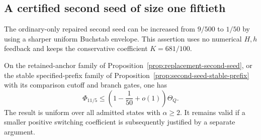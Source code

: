 \subsection{A certified second seed of size one fiftieth}
\label{sec:second-seed-omega-certified}

The ordinary-only repaired second seed can be increased from
$9/500$ to $1/50$ by using a sharper uniform Buchstab envelope.
This assertion uses no numerical $H,h$ feedback and keeps the
conservative coefficient $K=681/100$.

\begin{proposition}
\label{prop:second-seed-omega-certified}
On the retained-anchor family of
Proposition~\ref{prop:replacement-second-seed}, or the stable
specified-prefix family of
Proposition~\ref{prop:second-seed-stable-prefix} with its comparison
cutoff and branch gates, one has
\[
 \Phi_{11/5}\le\left(1-\frac1{50}+o(1)\right)\Theta_Q.
\]
The result is uniform over all admitted states with $\alpha\ge2$.
It remains valid if a smaller positive switching coefficient is
subsequently justified by a separate argument.
\end{proposition}

